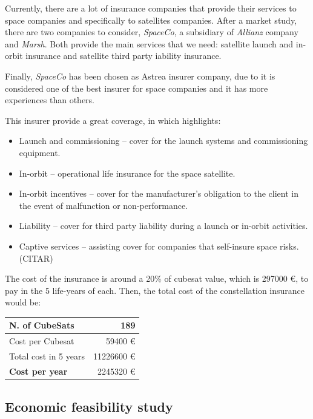 Currently, there are a lot of insurance companies that provide their services to space companies and specifically to  satellites companies. After a market study, there are two companies to consider, \textit{SpaceCo}, a subsidiary of \textit{Allianz} company and \textit{Marsh}. Both provide the main services that we need: satellite launch and in-orbit insurance and satellite third party iability insurance.

Finally, \textit{SpaceCo} has been chosen as Astrea insurer company, due to it is considered one of the best insurer for space companies and it has more experiences than others.

This insurer provide a great coverage, in which highlights:

\begin{itemize}

	\item Launch and commissioning – cover for the launch systems and commissioning equipment.
	\item In-orbit – operational life insurance for the space satellite.
	\item In-orbit incentives – cover for the manufacturer’s obligation to the client in the event of malfunction 		          or non-performance.
	\item Liability – cover for third party liability during a launch or in-orbit activities.
	\item Captive services – assisting cover for companies that self-insure space risks. \cite{} (CITAR)

\end{itemize}

The cost of the insurance is around a 20\% of cubesat value, which is 297000 \euro, to pay in the 5 life-years of each. Then, the total cost of the constellation insurance would be:

\begin{longtable}{| l | r |}
  \hline
	N. of CubeSats & 189 \\
  \hline
    Cost per Cubesat & 59400 \euro  \\
  \hline
    Total cost in 5 years & 11226600 \euro \\
  \hline
  	\textbf{Cost per year} & 2245320 \euro \\
  \hline

\end{longtable}

\subsection{Economic feasibility study}

